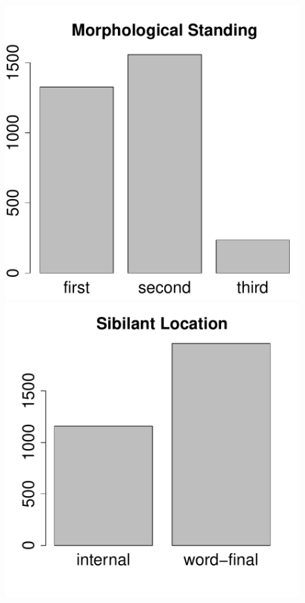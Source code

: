 \documentclass[a4paper]{article}
\begin{document}
\begin{figure}[ht]
    \begin{center}
      \begin{minipage}[t]{0.3\linewidth}
        \begin{center}
\includegraphics{prelim-012}
        \end{center}
      \end{minipage}
      \begin{minipage}[t]{0.3\linewidth}\begin{center}
\includegraphics{prelim-013}

\end{center}
\end{minipage}
\end{center}
\end{figure}
\end{document}
